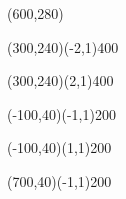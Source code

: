 \documentclass[12pt]{article}
\begin{document}
\begin{figure}[htb]
\hspace*{\fill}
\begin{egame}(600,280)

\renewcommand{\egarrowstyle}{e}

\putbranch(300,240)(-2,1){400}

\renewcommand{\egarrowstyle}{}

\putbranch(300,240)(2,1){400}

\renewcommand{\egarrowstyle}{e}

\putbranch(-100,40)(-1,1){200}

\renewcommand{\egarrowstyle}{}

\putbranch(-100,40)(1,1){200}

\renewcommand{\egarrowstyle}{}

\putbranch(700,40)(-1,1){200}

\renewcommand{\egarrowstyle}{e}


\end{egame}
\end{figure}
\end{document}
